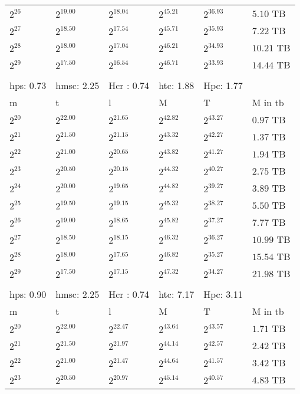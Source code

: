 \begin{tabular}{llllll}
$2^{26}$ & $2^{19.00}$ & $2^{18.04}$ & $2^{45.21}$ & $2^{36.93}$ & $5.10$ TB \\
$2^{27}$ & $2^{18.50}$ & $2^{17.54}$ & $2^{45.71}$ & $2^{35.93}$ & $7.22$ TB \\
$2^{28}$ & $2^{18.00}$ & $2^{17.04}$ & $2^{46.21}$ & $2^{34.93}$ & $10.21$ TB \\
$2^{29}$ & $2^{17.50}$ & $2^{16.54}$ & $2^{46.71}$ & $2^{33.93}$ & $14.44$ TB \\
 &  &  &  &  &  \\
hps: 0.73 & hmsc: 2.25 & Hcr : 0.74 & htc: 1.88 & Hpc: 1.77 &  \\
m & t & l & M & T & M in tb \\
$2^{20}$ & $2^{22.00}$ & $2^{21.65}$ & $2^{42.82}$ & $2^{43.27}$ & $0.97$ TB \\
$2^{21}$ & $2^{21.50}$ & $2^{21.15}$ & $2^{43.32}$ & $2^{42.27}$ & $1.37$ TB \\
$2^{22}$ & $2^{21.00}$ & $2^{20.65}$ & $2^{43.82}$ & $2^{41.27}$ & $1.94$ TB \\
$2^{23}$ & $2^{20.50}$ & $2^{20.15}$ & $2^{44.32}$ & $2^{40.27}$ & $2.75$ TB \\
$2^{24}$ & $2^{20.00}$ & $2^{19.65}$ & $2^{44.82}$ & $2^{39.27}$ & $3.89$ TB \\
$2^{25}$ & $2^{19.50}$ & $2^{19.15}$ & $2^{45.32}$ & $2^{38.27}$ & $5.50$ TB \\
$2^{26}$ & $2^{19.00}$ & $2^{18.65}$ & $2^{45.82}$ & $2^{37.27}$ & $7.77$ TB \\
$2^{27}$ & $2^{18.50}$ & $2^{18.15}$ & $2^{46.32}$ & $2^{36.27}$ & $10.99$ TB \\
$2^{28}$ & $2^{18.00}$ & $2^{17.65}$ & $2^{46.82}$ & $2^{35.27}$ & $15.54$ TB \\
$2^{29}$ & $2^{17.50}$ & $2^{17.15}$ & $2^{47.32}$ & $2^{34.27}$ & $21.98$ TB \\
 &  &  &  &  &  \\
hps: 0.90 & hmsc: 2.25 & Hcr : 0.74 & htc: 7.17 & Hpc: 3.11 &  \\
m & t & l & M & T & M in tb \\
$2^{20}$ & $2^{22.00}$ & $2^{22.47}$ & $2^{43.64}$ & $2^{43.57}$ & $1.71$ TB \\
$2^{21}$ & $2^{21.50}$ & $2^{21.97}$ & $2^{44.14}$ & $2^{42.57}$ & $2.42$ TB \\
$2^{22}$ & $2^{21.00}$ & $2^{21.47}$ & $2^{44.64}$ & $2^{41.57}$ & $3.42$ TB \\
$2^{23}$ & $2^{20.50}$ & $2^{20.97}$ & $2^{45.14}$ & $2^{40.57}$ & $4.83$ TB \\

\end{tabular}
